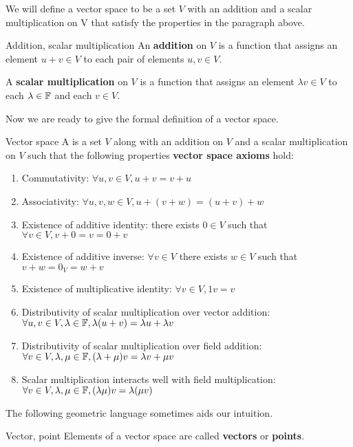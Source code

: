 We will define a vector space to be a set $V$ with an addition and a scalar multiplication on V that satisfy the properties in the paragraph above.

\begin{defn}{Addition, scalar multiplication}
An \textbf{addition} on $V$ is a function that assigns an element $u+v \in V$ to each pair of elements $u,v \in V$.

A \textbf{scalar multiplication} on $V$ is a function that assigns an element $\lambda v \in V$ to each $\lambda \in \mathbb F$ and each $v \in V$.
\end{defn}

Now we are ready to give the formal definition of a vector space.

\begin{defn}{Vector space}{}
A  is a set $V$ along with an addition on $V$ and a scalar multiplication on $V$ such that the following properties \textbf{vector space axioms} hold:
\begin{enumerate}[label=\textbf{V\arabic*}]
\item Commutativity: $\forall u, v \in V, u+v=v+u$
\item Associativity: $\forall u,v,w \in V, u+(v+w)=(u+v)+w$
\item Existence of additive identity: there exists $0 \in V$ such that $\forall v\in V, v + 0 = v = 0 + v$ 
\item Existence of additive inverse: $\forall v \in V$ there exists $w \in V$ such that $v + w = 0_V = w + v$ 
\item Existence of multiplicative identity: $\forall v\in V, 1v = v$
\item Distributivity of scalar multiplication over vector addition: $\forall u,v \in V, \lambda\in\mathbb F, \lambda(u + v) = \lambda u + \lambda v$
\item Distributivity of scalar multiplication over field addition: $\forall v\in V, \lambda,\mu\in\mathbb F, (\lambda+\mu)v = \lambda v + \mu v$
\item Scalar multiplication interacts well with field multiplication: $\forall v\in V, \lambda,\mu\in\mathbb F, (\lambda\mu)v = \lambda(\mu v)$
\end{enumerate}
\end{defn}

The following geometric language sometimes aids our intuition.

\begin{defn}{Vector, point}{}
Elements of a vector space are called \textbf{vectors} or \textbf{points}.
\end{defn}

